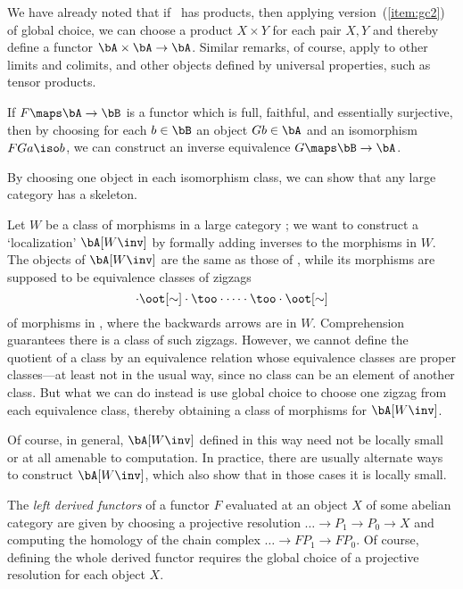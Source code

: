 \documentclass{amsart}
\begin{document}
\begin{eg}
  We have already noted that if \bA\ has products, then applying
  version~(\ref{item:gc2}) of global choice, we can choose a product
  $X\times Y$ for each pair $X,Y$ and thereby define a functor
  $\bA\times\bA\to\bA$.  Similar remarks, of course, apply to other
  limits and colimits, and other objects defined by universal
  properties, such as tensor products.
\end{eg}

\begin{eg}
  If $F\maps \bA\to\bB$ is a functor which is full, faithful, and
  essentially surjective, then by choosing for each $b\in \bB$ an
  object $Gb\in\bA$ and an isomorphism $FGa\iso b$, we can construct
  an inverse equivalence $G\maps \bB\to\bA$.
\end{eg}

\begin{eg}
  By choosing one object in each isomorphism class, we can show that
  any large category has a skeleton.
\end{eg}

\begin{eg}
  Let $W$ be a class of morphisms in a large category \bA; we want to
  construct a `localization' $\bA[W\inv]$ by formally adding inverses
  to the morphisms in $W$.  The objects of $\bA[W\inv]$ are the same
  as those of \bA, while its morphisms are supposed to be equivalence
  classes of zigzags
  \[\cdot \oot[\sim] \cdot \too\cdot \cdots \cdot \too \cdot \oot[\sim]\]
  of morphisms in \bA, where the backwards arrows are in $W$.
  Comprehension guarantees there is a class of such zigzags.  However,
  we cannot define the quotient of a class by an equivalence relation
  whose equivalence classes are proper classes---at least not in the
  usual way, since no class can be an element of another class.  But
  what we can do instead is use global choice to choose one zigzag
  from each equivalence class, thereby obtaining a class of morphisms
  for $\bA[W\inv]$.

  Of course, in general, $\bA[W\inv]$ defined in this way need not be
  locally small or at all amenable to computation.  In practice, there
  are usually alternate ways to construct $\bA[W\inv]$, which also
  show that in those cases it is locally small.
\end{eg}

\begin{eg}
  The \emph{left derived functors} of a functor $F$ evaluated at an
  object $X$ of some abelian category are given by choosing a
  projective resolution $\dots\to P_1\to P_0 \to X$ and computing the
  homology of the chain complex $\dots\to FP_1\to FP_0$.  Of course,
  defining the whole derived functor requires the global choice of a
  projective resolution for each object $X$.
\end{eg}
\end{document}
